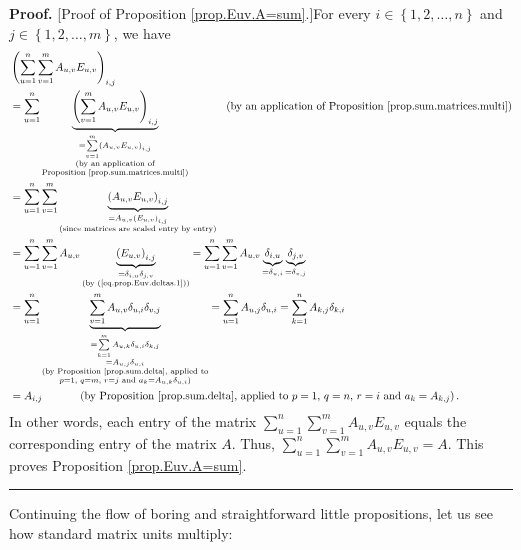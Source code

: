 \documentclass[numbers=enddot,12pt,final,onecolumn,notitlepage]{scrartcl}%
\theoremstyle{definition}
\newenvironment{proof}[1][Proof]{\noindent\textbf{#1.} }{\ \rule{0.5em}{0.5em}}
\let\sumnonlimits\sum
\renewcommand{\sum}{\sumnonlimits\limits}
\begin{document}
\begin{proof}
[Proof of Proposition \ref{prop.Euv.A=sum}.]For every $i\in\left\{
1,2,\ldots,n\right\}  $ and $j\in\left\{  1,2,\ldots,m\right\}  $, we have%
\begin{align*}
&  \left(  \sum_{u=1}^{n}\sum_{v=1}^{m}A_{u,v}E_{u,v}\right)  _{i,j}\\
&  =\sum_{u=1}^{n}\underbrace{\left(  \sum_{v=1}^{m}A_{u,v}E_{u,v}\right)
_{i,j}}_{\substack{=\sum_{v=1}^{m}\left(  A_{u,v}E_{u,v}\right)
_{i,j}\\\text{(by an application of}\\\text{Proposition
\ref{prop.sum.matrices.multi})}}}\ \ \ \ \ \ \ \ \ \ \left(  \text{by an
application of Proposition \ref{prop.sum.matrices.multi}}\right) \\
&  =\sum_{u=1}^{n}\sum_{v=1}^{m}\underbrace{\left(  A_{u,v}E_{u,v}\right)
_{i,j}}_{\substack{=A_{u,v}\left(  E_{u,v}\right)  _{i,j}\\\text{(since
matrices are scaled entry by entry)}}}\\
&  =\sum_{u=1}^{n}\sum_{v=1}^{m}A_{u,v}\underbrace{\left(  E_{u,v}\right)
_{i,j}}_{\substack{=\delta_{i,u}\delta_{j,v}\\\text{(by
(\ref{eq.prop.Euv.deltas.1}))}}}=\sum_{u=1}^{n}\sum_{v=1}^{m}A_{u,v}%
\underbrace{\delta_{i,u}}_{=\delta_{u,i}}\underbrace{\delta_{j,v}}%
_{=\delta_{v,j}}\\
&  =\sum_{u=1}^{n}\underbrace{\sum_{v=1}^{m}A_{u,v}\delta_{u,i}\delta_{v,j}%
}_{\substack{=\sum_{k=1}^{m}A_{u,k}\delta_{u,i}\delta_{k,j}\\=A_{u,j}%
\delta_{u,i}\\\text{(by Proposition \ref{prop.sum.delta}, applied
to}\\p=1\text{, }q=m\text{, }r=j\text{ and }a_{k}=A_{u,k}\delta_{u,i}\text{)}%
}}=\sum_{u=1}^{n}A_{u,j}\delta_{u,i}=\sum_{k=1}^{n}A_{k,j}\delta_{k,i}\\
&  =A_{i,j}\ \ \ \ \ \ \ \ \ \ \left(  \text{by Proposition
\ref{prop.sum.delta}, applied to }p=1\text{, }q=n\text{, }r=i\text{ and }%
a_{k}=A_{k,j}\right)  .
\end{align*}
In other words, each entry of the matrix $\sum_{u=1}^{n}\sum_{v=1}^{m}%
A_{u,v}E_{u,v}$ equals the corresponding entry of the matrix $A$. Thus,
$\sum_{u=1}^{n}\sum_{v=1}^{m}A_{u,v}E_{u,v}=A$. This proves Proposition
\ref{prop.Euv.A=sum}.
\end{proof}

Continuing the flow of boring and straightforward little propositions, let us
see how standard matrix units multiply:
\end{document}
